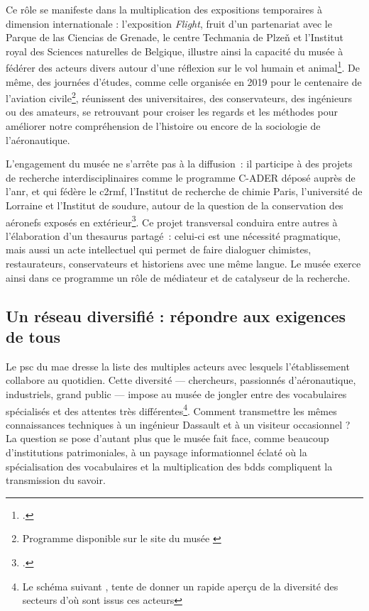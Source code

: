 Ce rôle se manifeste dans la multiplication des expositions temporaires à dimension internationale : l’exposition \emph{Flight}, fruit d’un partenariat avec le Parque de las Ciencias de Grenade, le centre Techmania de Plzeň et l’Institut royal des Sciences naturelles de Belgique, illustre ainsi la capacité du musée à fédérer des acteurs divers autour d’une réflexion sur le vol humain et animal\footcite{ExpositionFlight2024}. De même, des journées d’études, comme celle organisée en 2019 pour le centenaire de l’aviation civile\footnote{Programme disponible sur le site du musée \cite{19192019CentAns}}, réunissent des universitaires, des conservateurs, des ingénieurs ou des amateurs, se retrouvant pour croiser les regards et les méthodes pour améliorer notre compréhension de l'histoire ou encore de la sociologie de l'aéronautique.

L’engagement du musée ne s’arrête pas à la diffusion : il participe à des projets de recherche interdisciplinaires comme le programme C-ADER déposé auprès de l'\ac{anr}, et qui fédère le \ac{c2rmf}, l’Institut de recherche de chimie Paris, l’université de Lorraine et l’Institut de soudure, autour de la  question de la conservation des aéronefs exposés en extérieur\footcite{CADERConservationDanciens}. Ce projet transversal conduira entre autres à l’élaboration d’un \gls{thesaurus} partagé : celui-ci est une nécessité pragmatique, mais aussi un acte intellectuel qui permet de faire dialoguer chimistes, restaurateurs, conservateurs et historiens avec une même langue. Le musée exerce ainsi dans ce programme un rôle de médiateur et de catalyseur de la recherche.

\subsection{Un réseau diversifié : répondre aux exigences de tous}

Le \ac{psc} du \ac{mae} dresse la liste des multiples acteurs avec lesquels l'établissement collabore au quotidien. Cette diversité — chercheurs, passionnés d'aéronautique, industriels, grand public — impose au musée de jongler entre des vocabulaires spécialisés et des attentes très différentes\footnote{Le schéma suivant , tente de donner un rapide aperçu de la diversité des secteurs d'où sont issus ces acteurs}. Comment transmettre les mêmes connaissances techniques à un ingénieur Dassault et à un visiteur occasionnel ? La question se pose d'autant plus que le musée fait face, comme beaucoup d'institutions patrimoniales, à un paysage informationnel éclaté où la spécialisation des vocabulaires et la multiplication des \glspl{bdd} compliquent la transmission du savoir.

